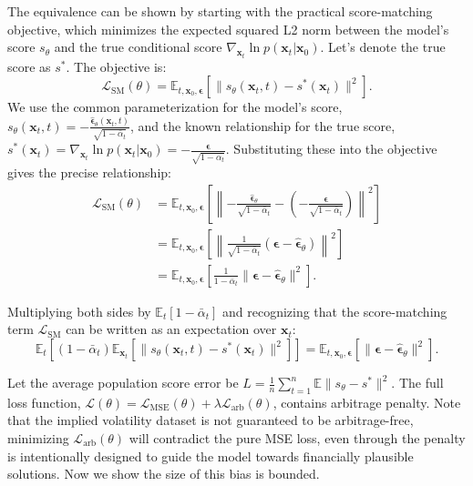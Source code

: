\documentclass{article}
\begin{document}
The equivalence can be shown by starting with the practical score-matching objective, which minimizes the expected squared L2 norm between the model's score $s_\theta$ and the true conditional score $\nabla_{\mathbf{x}_t} \ln p(\mathbf{x}_t | \mathbf{x}_0)$. Let's denote the true score as $s^*$. The objective is:
\begin{equation}
\mathcal{L}_{\text{SM}}(\theta) = \mathbb{E}_{t, \mathbf{x}_0, \boldsymbol{\epsilon}} \left[ \| s_\theta(\mathbf{x}_t, t) - s^*(\mathbf{x}_t) \|^2 \right].
\end{equation}
We use the common parameterization for the model's score, $s_\theta(\mathbf{x}_t, t) = -\frac{\hat{\boldsymbol{\epsilon}}_\theta(\mathbf{x}_t, t)}{\sqrt{1 - \bar{\alpha}_t}}$, and the known relationship for the true score, $s^*(\mathbf{x}_t) = \nabla_{\mathbf{x}_t} \ln p(\mathbf{x}_t | \mathbf{x}_0) = -\frac{\boldsymbol{\epsilon}}{\sqrt{1 - \bar{\alpha}_t}}$. Substituting these into the objective gives the precise relationship:
\begin{align}
\mathcal{L}_{\text{SM}}(\theta) &= \mathbb{E}_{t, \mathbf{x}_0, \boldsymbol{\epsilon}} \left[ \left\| -\frac{\hat{\boldsymbol{\epsilon}}_\theta}{\sqrt{1 - \bar{\alpha}_t}} - \left( -\frac{\boldsymbol{\epsilon}}{\sqrt{1 - \bar{\alpha}_t}} \right) \right\|^2 \right] \nonumber \\
&= \mathbb{E}_{t, \mathbf{x}_0, \boldsymbol{\epsilon}} \left[ \left\| \frac{1}{\sqrt{1 - \bar{\alpha}_t}} (\boldsymbol{\epsilon} - \hat{\boldsymbol{\epsilon}}_\theta) \right\|^2 \right] \nonumber \\
&= \mathbb{E}_{t, \mathbf{x}_0, \boldsymbol{\epsilon}} \left[ \frac{1}{1 - \bar{\alpha}_t} \| \boldsymbol{\epsilon} - \hat{\boldsymbol{\epsilon}}_\theta \|^2 \right] \label{eq:weighted_mse}.
\end{align}

Multiplying both sides by $\mathbb{E}_t[1-\bar{\alpha}_t]$ and recognizing that the score-matching term $\mathcal{L}_{\text{SM}}$ can be written as an expectation over $\mathbf{x}_t$:
\begin{equation}
\mathbb{E}_{t} \left[ (1 - \bar{\alpha}_t) \mathbb{E}_{\mathbf{x}_t} \left[ \| s_\theta(\mathbf{x}_t, t) - s^*(\mathbf{x}_t) \|^2 \right] \right] = \mathbb{E}_{t, \mathbf{x}_0, \boldsymbol{\epsilon}} \left[ \| \boldsymbol{\epsilon} - \hat{\boldsymbol{\epsilon}}_\theta \|^2 \right].
\end{equation}

Let the average population score error be $L = \frac{1}{n} \sum_{t=1}^n \mathbb{E} \| s_\theta - s^* \|^2$.
The full loss function, $\mathcal{L}(\theta) = \mathcal{L}_{\text{MSE}}(\theta) + \lambda \mathcal{L}_{\text{arb}}(\theta)$, contains arbitrage penalty. Note that the implied volatility dataset is not guaranteed to be arbitrage-free, minimizing $\mathcal{L}_{\text{arb}}(\theta)$ will contradict the pure MSE loss, even through the penalty is intentionally designed to guide the model towards financially plausible solutions. Now we show the size of this bias is bounded.
\end{document}
